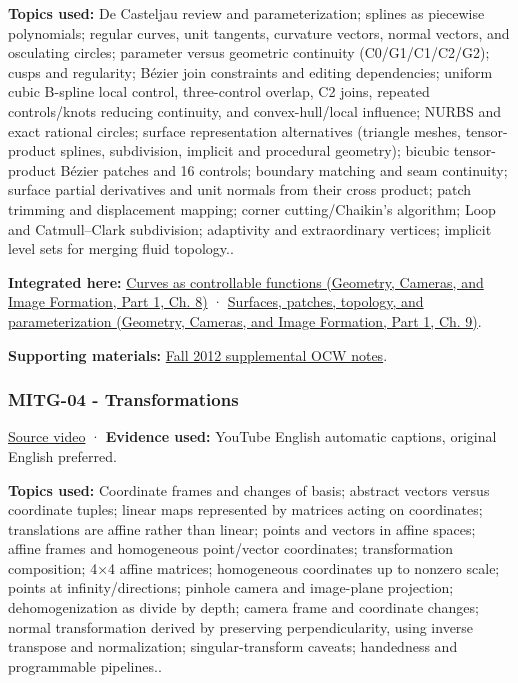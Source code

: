 \textbf{Topics used:} De Casteljau review and parameterization; splines as piecewise polynomials; regular curves, unit tangents, curvature vectors, normal vectors, and osculating circles; parameter versus geometric continuity (C0/G1/C1/C2/G2); cusps and regularity; Bézier join constraints and editing dependencies; uniform cubic B-spline local control, three-control overlap, C2 joins, repeated controls/knots reducing continuity, and convex-hull/local influence; NURBS and exact rational circles; surface representation alternatives (triangle meshes, tensor-product splines, subdivision, implicit and procedural geometry); bicubic tensor-product Bézier patches and 16 controls; boundary matching and seam continuity; surface partial derivatives and unit normals from their cross product; patch trimming and displacement mapping; corner cutting/Chaikin's algorithm; Loop and Catmull--Clark subdivision; adaptivity and extraordinary vertices; implicit level sets for merging fluid topology..

\textbf{Integrated here:} \href{../03-Geometry-Cameras-and-Image-Formation-P01/main.pdf\#03-visual-computing-i-ch001-curves-as-controllable-functions}{Curves as controllable functions (Geometry, Cameras, and Image Formation, Part 1, Ch. 8)} · \href{../03-Geometry-Cameras-and-Image-Formation-P01/main.pdf\#03-visual-computing-i-ch002-surfaces-patches-topology-and-parameterization}{Surfaces, patches, topology, and parameterization (Geometry, Cameras, and Image Formation, Part 1, Ch. 9)}.

\textbf{Supporting materials:} \href{https://ocw.mit.edu/courses/6-837-computer-graphics-fall-2012/pages/lecture-notes/}{Fall 2012 supplemental OCW notes}.

\subsubsection{MITG-04 - Transformations}\label{04-visual-computing-ii-ch036-mitg-04---transformations}

\hypertarget{04-visual-computing-ii-ch036-mitg-04---transformations}{}

\href{https://www.youtube.com/watch?v=WqmL_e7OGeU}{Source video} · \textbf{Evidence used:} YouTube English automatic captions, original English preferred.

\textbf{Topics used:} Coordinate frames and changes of basis; abstract vectors versus coordinate tuples; linear maps represented by matrices acting on coordinates; translations are affine rather than linear; points and vectors in affine spaces; affine frames and homogeneous point/vector coordinates; transformation composition; 4×4 affine matrices; homogeneous coordinates up to nonzero scale; points at infinity/directions; pinhole camera and image-plane projection; dehomogenization as divide by depth; camera frame and coordinate changes; normal transformation derived by preserving perpendicularity, using inverse transpose and normalization; singular-transform caveats; handedness and programmable pipelines..

